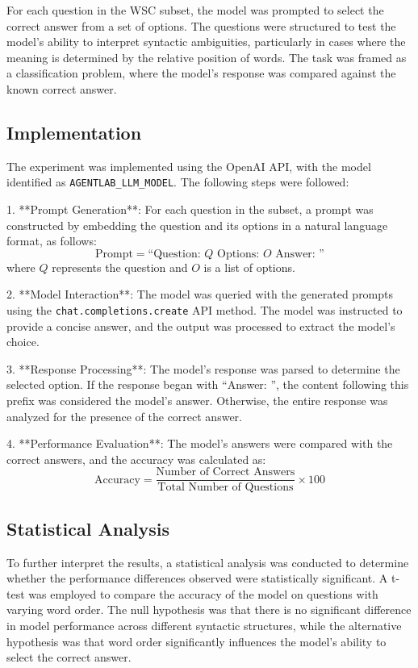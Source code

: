 \documentclass{article}
\begin{document}
For each question in the WSC subset, the model was prompted to select the correct answer from a set of options. The questions were structured to test the model's ability to interpret syntactic ambiguities, particularly in cases where the meaning is determined by the relative position of words. The task was framed as a classification problem, where the model's response was compared against the known correct answer.

\subsection*{Implementation}

The experiment was implemented using the OpenAI API, with the model identified as \texttt{AGENTLAB\_LLM\_MODEL}. The following steps were followed:

1. **Prompt Generation**: For each question in the subset, a prompt was constructed by embedding the question and its options in a natural language format, as follows:
   $$
   \text{Prompt} = \text{``Question: } Q \text{ Options: } O \text{ Answer: ''}
   $$
   where $ Q $ represents the question and $ O $ is a list of options.

2. **Model Interaction**: The model was queried with the generated prompts using the \texttt{chat.completions.create} API method. The model was instructed to provide a concise answer, and the output was processed to extract the model's choice.

3. **Response Processing**: The model's response was parsed to determine the selected option. If the response began with ``Answer: '', the content following this prefix was considered the model's answer. Otherwise, the entire response was analyzed for the presence of the correct answer.

4. **Performance Evaluation**: The model's answers were compared with the correct answers, and the accuracy was calculated as:
   $$
   \text{Accuracy} = \frac{\text{Number of Correct Answers}}{\text{Total Number of Questions}} \times 100
   $$

\subsection*{Statistical Analysis}

To further interpret the results, a statistical analysis was conducted to determine whether the performance differences observed were statistically significant. A t-test was employed to compare the accuracy of the model on questions with varying word order. The null hypothesis was that there is no significant difference in model performance across different syntactic structures, while the alternative hypothesis was that word order significantly influences the model's ability to select the correct answer.
\end{document}
